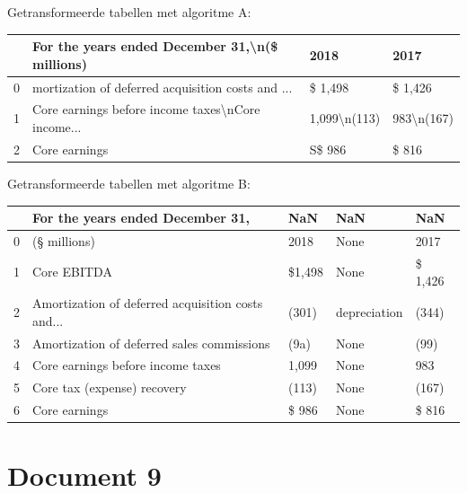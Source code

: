 Getransformeerde tabellen met algoritme A:

\begin{tabular}{llll}
\toprule
{} &     For the years ended December 31,\textbackslash n(\$ millions) &          2018 &        2017 \\
\midrule
0 &  mortization of deferred acquisition costs and ... &       \$ 1,498 &     \$ 1,426 \\
1 &  Core earnings before income taxes\textbackslash nCore income... &  1,099\textbackslash n(113) &  983\textbackslash n(167) \\
2 &                                      Core earnings &        S\$ 986 &       \$ 816 \\
\bottomrule
\end{tabular}

Getransformeerde tabellen met algoritme B:

\begin{tabular}{lllll}
\toprule
{} &                   For the years ended December 31, &     NaN &           NaN &      NaN \\
\midrule
0 &                                       (§ millions) &    2018 &          None &     2017 \\
1 &                                        Core EBITDA &  \$1,498 &          None &  \$ 1,426 \\
2 &  Amortization of deferred acquisition costs and... &   (301) &  depreciation &    (344) \\
3 &         Amortization of deferred sales commissions &    (9a) &          None &     (99) \\
4 &                  Core earnings before income taxes &   1,099 &          None &      983 \\
5 &                        Core tax (expense) recovery &   (113) &          None &    (167) \\
6 &                                      Core earnings &   \$ 986 &          None &    \$ 816 \\
\bottomrule
\end{tabular}
\section{Document 9}

